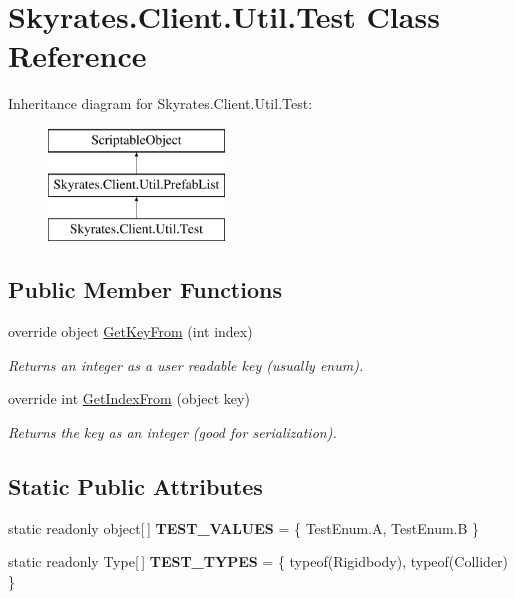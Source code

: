 \hypertarget{class_skyrates_1_1_client_1_1_util_1_1_test}{\section{Skyrates.\-Client.\-Util.\-Test Class Reference}
\label{class_skyrates_1_1_client_1_1_util_1_1_test}
}
Inheritance diagram for Skyrates.\-Client.\-Util.\-Test\-:\begin{figure}[H]
\begin{center}
\leavevmode
\includegraphics[height=3.000000cm]{class_skyrates_1_1_client_1_1_util_1_1_test}
\end{center}
\end{figure}
\subsection*{Public Member Functions}
\begin{DoxyCompactItemize}
\item 
override object \hyperlink{class_skyrates_1_1_client_1_1_util_1_1_test_a6dfcf2dbe2aa97e9f193c09085a86d75}{Get\-Key\-From} (int index)
\begin{DoxyCompactList}\small\item\em Returns an integer as a user readable key (usually enum). \end{DoxyCompactList}\item 
override int \hyperlink{class_skyrates_1_1_client_1_1_util_1_1_test_a92aef1965d6b0faad508d306398af8a8}{Get\-Index\-From} (object key)
\begin{DoxyCompactList}\small\item\em Returns the key as an integer (good for serialization). \end{DoxyCompactList}\end{DoxyCompactItemize}
\subsection*{Static Public Attributes}
\begin{DoxyCompactItemize}
\item 
\hypertarget{class_skyrates_1_1_client_1_1_util_1_1_test_a2e88a747f7b4b5abb18c1899cf16e710}{static readonly object\mbox{[}$\,$\mbox{]} {\bfseries T\-E\-S\-T\-\_\-\-V\-A\-L\-U\-E\-S} = \{ Test\-Enum.\-A, Test\-Enum.\-B \}}\label{class_skyrates_1_1_client_1_1_util_1_1_test_a2e88a747f7b4b5abb18c1899cf16e710}

\item 
\hypertarget{class_skyrates_1_1_client_1_1_util_1_1_test_a05f000700e57b0efbfbcf036138c24f8}{static readonly Type\mbox{[}$\,$\mbox{]} {\bfseries T\-E\-S\-T\-\_\-\-T\-Y\-P\-E\-S} = \{ typeof(Rigidbody), typeof(Collider) \}}\label{class_skyrates_1_1_client_1_1_util_1_1_test_a05f000700e57b0efbfbcf036138c24f8}

\end{DoxyCompactItemize}
